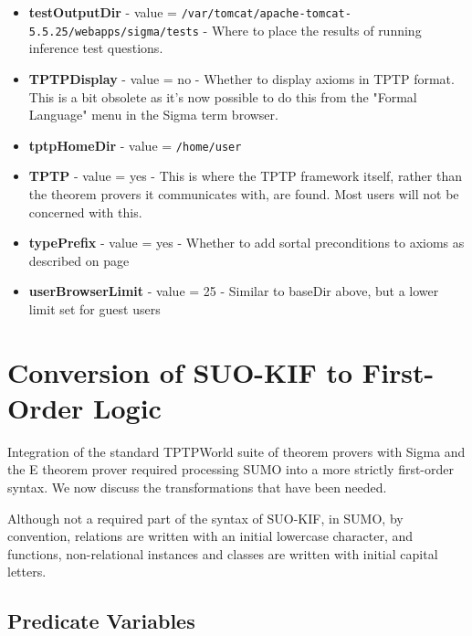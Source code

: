 \documentclass{book}
\begin{document}
\begin{itemize}
  \item \textbf{testOutputDir} - value = \texttt{/var/tomcat/apache-tomcat-5.5.25/webapps/sigma/tests} 
- Where to place the results of running inference test questions.

  \item \textbf{TPTPDisplay} - value = no - Whether to display axioms in TPTP format.  This is a bit
obsolete as it's now possible to do this from the "Formal Language" menu in the Sigma term browser.

  \item \textbf{tptpHomeDir} - value = \texttt{/home/user} 

  \item \textbf{TPTP} - value = yes - This is where the TPTP framework itself, rather than the
theorem provers it communicates with, are found. Most users will not be concerned with this.

  \item \textbf{typePrefix} - value = yes - Whether to add sortal preconditions to axioms as described on
page \pageref{chap:KnowRep:subsec:Sortal}

  \item \textbf{userBrowserLimit} - value = 25 - Similar to baseDir above, but a lower
limit set for guest users

\end{itemize}


\section{Conversion of SUO-KIF to First-Order Logic}
\label{chap:KnowRepr:sec:Conv}

Integration of the standard TPTPWorld suite of theorem provers
with Sigma \cite{tsp08} and the E theorem prover \cite{Schulz:AICOM-2002}
required processing SUMO into a more strictly first-order syntax. We now discuss
the transformations that have been needed.

\small
Although not a required part of the syntax of SUO-KIF, in SUMO, by convention,
relations are written with an initial lowercase character, and functions,
non-relational instances and classes are written with initial capital letters.
\normalsize

\subsection{Predicate Variables}
\label{chap:KnowRep:subsec:PredVar}  
\end{document}
